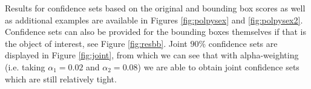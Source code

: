 Results for confidence sets based on the original and bounding box scores as well as additional examples are available in Figures \ref{fig:polpysex} and \ref{fig:polpysex2}. Confidence sets can also be provided for the bounding boxes themselves if that is the object of interest, see Figure \ref{fig:resbb}. Joint $90\%$ confidence sets are displayed in Figure \ref{fig:joint}, from which we can see that with alpha-weighting (i.e. taking $\alpha_1 = 0.02$ and $\alpha_2 = 0.08$) we are able to obtain joint confidence sets which are still relatively tight.

